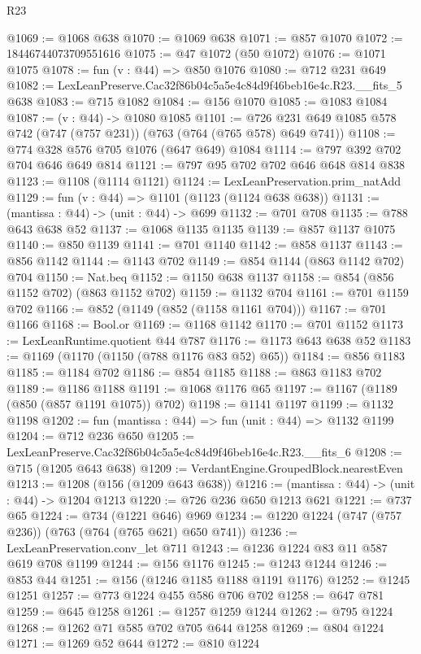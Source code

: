 \begin{lexlean}{R23}
\begin{coremodule}
@1069 := @1068 @638
@1070 := @1069 @638
@1071 := @857 @1070
@1072 := 18446744073709551616
@1075 := @47 @1072 (@50 @1072)
@1076 := @1071 @1075
@1078 := fun (v : @44) => @850 @1076
@1080 := @712 @231 @649
@1082 := LexLeanPreserve.Cac32f86b04c5a5e4c84d9f46beb16e4c.R23.__fits_5 @638
@1083 := @715 @1082
@1084 := @156 @1070
@1085 := @1083 @1084
@1087 := (v : @44) -> @1080 @1085
@1101 := @726 @231 @649 @1085 @578 @742 (@747 (@757 @231)) (@763 (@764 (@765 @578) @649 @741))
@1108 := @774 @328 @576 @705 @1076 (@647 @649) @1084
@1114 := @797 @392 @702 @704 @646 @649 @814
@1121 := @797 @95 @702 @702 @646 @648 @814 @838
@1123 := @1108 (@1114 @1121)
@1124 := LexLeanPreservation.prim_natAdd
@1129 := fun (v : @44) => @1101 (@1123 (@1124 @638 @638))
@1131 := (mantissa : @44) -> (unit : @44) -> @699
@1132 := @701 @708
@1135 := @788 @643 @638 @52
@1137 := @1068 @1135 @1135
@1139 := @857 @1137 @1075
@1140 := @850 @1139
@1141 := @701 @1140
@1142 := @858 @1137
@1143 := @856 @1142
@1144 := @1143 @702
@1149 := @854 @1144 (@863 @1142 @702) @704
@1150 := Nat.beq
@1152 := @1150 @638 @1137
@1158 := @854 (@856 @1152 @702) (@863 @1152 @702)
@1159 := @1132 @704
@1161 := @701 @1159 @702
@1166 := @852 (@1149 (@852 (@1158 @1161 @704)))
@1167 := @701 @1166
@1168 := Bool.or
@1169 := @1168 @1142
@1170 := @701 @1152
@1173 := LexLeanRuntime.quotient @44 @787
@1176 := @1173 @643 @638 @52
@1183 := @1169 (@1170 (@1150 (@788 @1176 @83 @52) @65))
@1184 := @856 @1183
@1185 := @1184 @702
@1186 := @854 @1185
@1188 := @863 @1183 @702
@1189 := @1186 @1188
@1191 := @1068 @1176 @65
@1197 := @1167 (@1189 (@850 (@857 @1191 @1075)) @702)
@1198 := @1141 @1197
@1199 := @1132 @1198
@1202 := fun (mantissa : @44) => fun (unit : @44) => @1132 @1199
@1204 := @712 @236 @650
@1205 := LexLeanPreserve.Cac32f86b04c5a5e4c84d9f46beb16e4c.R23.__fits_6
@1208 := @715 (@1205 @643 @638)
@1209 := VerdantEngine.GroupedBlock.nearestEven
@1213 := @1208 (@156 (@1209 @643 @638))
@1216 := (mantissa : @44) -> (unit : @44) -> @1204 @1213
@1220 := @726 @236 @650 @1213 @621
@1221 := @737 @65
@1224 := @734 (@1221 @646) @969
@1234 := @1220 @1224 (@747 (@757 @236)) (@763 (@764 (@765 @621) @650 @741))
@1236 := LexLeanPreservation.conv_let @711
@1243 := @1236 @1224 @83 @11 @587 @619 @708 @1199
@1244 := @156 @1176
@1245 := @1243 @1244
@1246 := @853 @44
@1251 := @156 (@1246 @1185 @1188 @1191 @1176)
@1252 := @1245 @1251
@1257 := @773 @1224 @455 @586 @706 @702
@1258 := @647 @781
@1259 := @645 @1258
@1261 := @1257 @1259 @1244
@1262 := @795 @1224
@1268 := @1262 @71 @585 @702 @705 @644 @1258
@1269 := @804 @1224
@1271 := @1269 @52 @644
@1272 := @810 @1224

\end{coremodule}
\end{lexlean}
